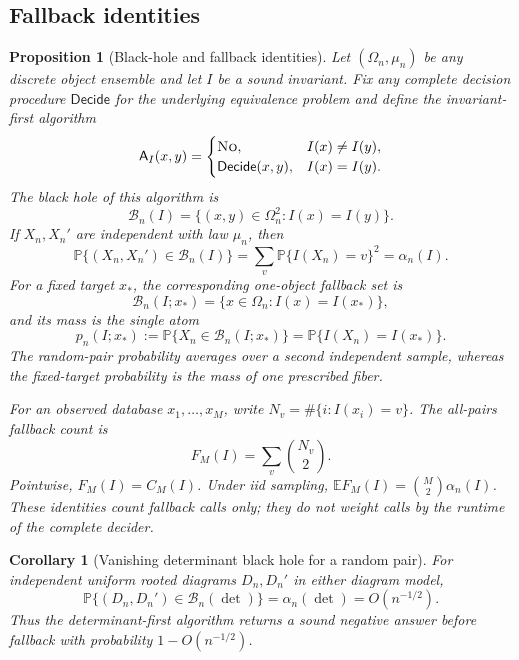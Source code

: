 \documentclass[9pt,twoside]{pnas-new}
\newtheorem{corollary}[theorem]{Corollary}
\newtheorem{proposition}[theorem]{Proposition}
\theoremstyle{definition}
\theoremstyle{remark}
\renewcommand{\Pr}{\mathbb{P}}
\begin{document}
\subsection{Fallback identities}
\begin{proposition}[Black-hole and fallback identities]
\label{prop:si-black-hole-identities}
Let $(\Omega_n,\mu_n)$ be any discrete object ensemble and let $I$ be a sound invariant. Fix any complete decision procedure $\mathsf{Decide}$ for the underlying equivalence problem and define the invariant-first algorithm
\[
 \mathsf A_I(x,y)=
 \begin{cases}
  \textup{\textsc{No}},& I(x)\ne I(y),\\
  \mathsf{Decide}(x,y),& I(x)=I(y).
 \end{cases}
\]
The black hole of this algorithm is
\[
 \mathcal B_n(I)=\{(x,y)\in\Omega_n^2:I(x)=I(y)\}.
\]
If $X_n,X_n'$ are independent with law $\mu_n$, then
\begin{equation}
 \Pr\{(X_n,X_n')\in\mathcal B_n(I)\}
 =\sum_v\Pr\{I(X_n)=v\}^2
 =\alpha_n(I).
 \label{eq:si-black-hole-identity}
\end{equation}
For a fixed target $x_*$, the corresponding one-object fallback set is
\[
 \mathcal B_n(I;x_*)=\{x\in\Omega_n:I(x)=I(x_*)\},
\]
and its mass is the single atom
\begin{equation}
 p_n(I;x_*):=\Pr\{X_n\in\mathcal B_n(I;x_*)\}
 =\Pr\{I(X_n)=I(x_*)\}.
 \label{eq:si-fixed-atom}
\end{equation}
The random-pair probability averages over a second independent sample, whereas the fixed-target probability is the mass of one prescribed fiber.

For an observed database $x_1,\ldots,x_M$, write
$N_v=\#\{i:I(x_i)=v\}$.  The all-pairs fallback count is
\begin{equation}
 F_M(I)=\sum_v\binom{N_v}{2}.
 \label{eq:si-observed-fallback}
\end{equation}
Pointwise, $F_M(I)=C_M(I)$.  Under iid sampling,
$\mathbb EF_M(I)=\binom M2\alpha_n(I)$.  These identities count fallback calls only; they do not weight calls by the runtime of the complete decider.
\end{proposition}

\begin{corollary}[Vanishing determinant black hole for a random pair]
\label{cor:si-random-black-hole}
For independent uniform rooted diagrams $D_n,D_n'$ in either diagram model,
\[
 \Pr\{(D_n,D_n')\in\mathcal B_n(\det)\}
 =\alpha_n(\det)=O(n^{-1/2}).
\]
Thus the determinant-first algorithm returns a sound negative answer before fallback with probability $1-O(n^{-1/2})$.
\end{corollary}
\end{document}
